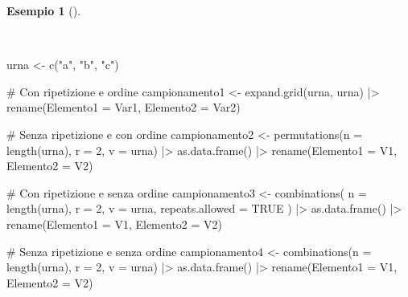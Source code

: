 \documentclass[
  italian,
  letterpaper,
  a4paper,
  11pt,
  open=any]{scrbook}
\newenvironment{Shaded}{\begin{snugshade}}{\end{snugshade}}
\newcommand{\AttributeTok}[1]{\textcolor[rgb]{0.40,0.45,0.13}{#1}}
\newcommand{\CommentTok}[1]{\textcolor[rgb]{0.37,0.37,0.37}{#1}}
\newcommand{\ConstantTok}[1]{\textcolor[rgb]{0.56,0.35,0.01}{#1}}
\newcommand{\DecValTok}[1]{\textcolor[rgb]{0.68,0.00,0.00}{#1}}
\newcommand{\FunctionTok}[1]{\textcolor[rgb]{0.28,0.35,0.67}{#1}}
\newcommand{\NormalTok}[1]{\textcolor[rgb]{0.00,0.23,0.31}{#1}}
\newcommand{\OtherTok}[1]{\textcolor[rgb]{0.00,0.23,0.31}{#1}}
\newcommand{\SpecialCharTok}[1]{\textcolor[rgb]{0.37,0.37,0.37}{#1}}
\newcommand{\StringTok}[1]{\textcolor[rgb]{0.13,0.47,0.30}{#1}}
\theoremstyle{plain}
\theoremstyle{definition}
\newtheorem{example}{Esempio}[chapter]
\theoremstyle{definition}
\theoremstyle{remark}
\begin{document}
\begin{example}[]\protect\hypertarget{exm-}{}\label{exm-}

~

\begin{Shaded}
\begin{Highlighting}[]
\NormalTok{urna }\OtherTok{\textless{}{-}} \FunctionTok{c}\NormalTok{(}\StringTok{"a"}\NormalTok{, }\StringTok{"b"}\NormalTok{, }\StringTok{"c"}\NormalTok{)}

\CommentTok{\# Con ripetizione e ordine}
\NormalTok{campionamento1 }\OtherTok{\textless{}{-}} \FunctionTok{expand.grid}\NormalTok{(urna, urna) }\SpecialCharTok{|\textgreater{}}
    \FunctionTok{rename}\NormalTok{(}\AttributeTok{Elemento1 =}\NormalTok{ Var1, }\AttributeTok{Elemento2 =}\NormalTok{ Var2)}

\CommentTok{\# Senza ripetizione e con ordine}
\NormalTok{campionamento2 }\OtherTok{\textless{}{-}} \FunctionTok{permutations}\NormalTok{(}\AttributeTok{n =} \FunctionTok{length}\NormalTok{(urna), }\AttributeTok{r =} \DecValTok{2}\NormalTok{, }\AttributeTok{v =}\NormalTok{ urna) }\SpecialCharTok{|\textgreater{}}
    \FunctionTok{as.data.frame}\NormalTok{() }\SpecialCharTok{|\textgreater{}}
    \FunctionTok{rename}\NormalTok{(}\AttributeTok{Elemento1 =}\NormalTok{ V1, }\AttributeTok{Elemento2 =}\NormalTok{ V2)}

\CommentTok{\# Con ripetizione e senza ordine}
\NormalTok{campionamento3 }\OtherTok{\textless{}{-}} \FunctionTok{combinations}\NormalTok{(}
    \AttributeTok{n =} \FunctionTok{length}\NormalTok{(urna), }\AttributeTok{r =} \DecValTok{2}\NormalTok{, }\AttributeTok{v =}\NormalTok{ urna, }\AttributeTok{repeats.allowed =} \ConstantTok{TRUE}
\NormalTok{) }\SpecialCharTok{|\textgreater{}}
    \FunctionTok{as.data.frame}\NormalTok{() }\SpecialCharTok{|\textgreater{}}
    \FunctionTok{rename}\NormalTok{(}\AttributeTok{Elemento1 =}\NormalTok{ V1, }\AttributeTok{Elemento2 =}\NormalTok{ V2)}

\CommentTok{\# Senza ripetizione e senza ordine}
\NormalTok{campionamento4 }\OtherTok{\textless{}{-}} \FunctionTok{combinations}\NormalTok{(}\AttributeTok{n =} \FunctionTok{length}\NormalTok{(urna), }\AttributeTok{r =} \DecValTok{2}\NormalTok{, }\AttributeTok{v =}\NormalTok{ urna) }\SpecialCharTok{|\textgreater{}}
    \FunctionTok{as.data.frame}\NormalTok{() }\SpecialCharTok{|\textgreater{}}
    \FunctionTok{rename}\NormalTok{(}\AttributeTok{Elemento1 =}\NormalTok{ V1, }\AttributeTok{Elemento2 =}\NormalTok{ V2)}


\end{Highlighting}
\end{Shaded}
\end{example}
\end{document}
